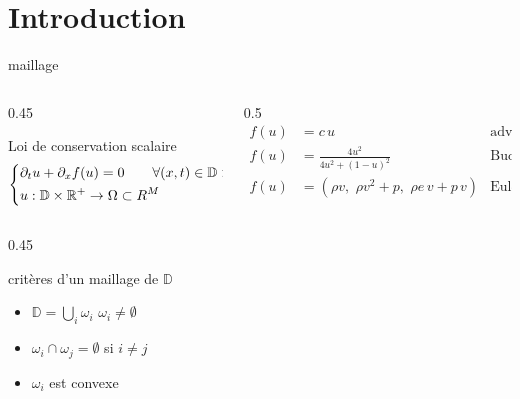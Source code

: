 
\section{Introduction}

\begin{frame}{maillage}

\begin{columns}
\begin{column}{0.45 \textwidth}

\begin{block}{Loi de conservation scalaire}
\begin{equation}
\left\{
\begin{aligned}
    &\partial_t u + \partial_x f(u) = 0\qquad \forall (x,t) \in \mathbb{D} \times \mathbb{R}^+ \\
    & u : \mathbb{D} \times \mathbb{R}^+ \to \Omega \subset R^M
\end{aligned}    
\right.
\end{equation}
\end{block}
\end{column}

\begin{column}{0.5 \textwidth}
\begin{align*}
    f(u) &= c\,u            & \text{advection}\\
    f(u) &= \frac{4u^2}{4u^2 +(1-u)^2}  &\text{Buckley}\\
    f(u) &= (\rho v,\,\, \rho v^2 + p, \,\,\rho e\, v+ p\, v ) &\text{Euler}
\end{align*}
\end{column}

\end{columns}

\begin{columns}
\begin{column}{0.45\textwidth}
\begin{block}{critères d'un maillage de $\mathbb{D}$}
\begin{itemize}
    \item $\mathbb{D} = \bigcup_i \omega_i$ \qquad $\omega_i \neq \emptyset $\\
    \item $\omega_i \cap \omega_j = \emptyset$ si $i\neq j$\\
    \item $\omega_i$ est convexe 
\end{itemize}
\end{block}
\end{column}


\end{columns}
\end{frame}
